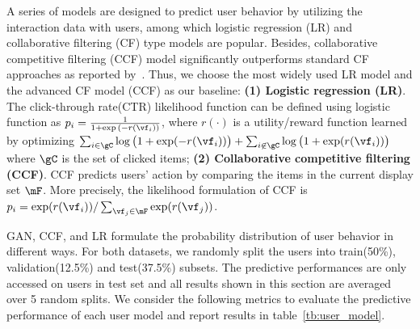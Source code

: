 \documentclass{article} %
\begin{document}
A series of models are designed to predict user behavior by utilizing the interaction data with users, among which logistic regression (LR) and collaborative filtering (CF) type models are popular. Besides, collaborative competitive filtering (CCF) model significantly outperforms standard CF approaches as reported by~\cite{YanLonSmoEtal11b}. Thus, we choose the most widely used LR model and the advanced CF model (CCF) as our baseline: {\bf (1) Logistic regression (LR)}. The click-through rate(CTR) likelihood function can be defined using logistic function as $p_i = \frac{1}{1+\exp{(-r(\vf_i))}}$, where $r(\cdot)$ is a utility/reward function learned by optimizing $\sum_{i\in \gC}\log \big(1+\exp(-r(\vf_i))\big) + \sum_{i \not\in \gC}\log\big(1+\exp(r(\vf_i))\big)$ where $\gC$ is the set of clicked items;
{\bf (2) Collaborative competitive filtering (CCF)}. CCF predicts users' action by comparing the items in the current display set $\mF$. More precisely, the likelihood formulation of CCF is $p_i = \exp(r(\vf_i))/\sum_{\vf_j \in \mF }\exp(r(\vf_j))$.

GAN, CCF, and LR formulate the probability distribution of user behavior in different ways. For both datasets, we randomly split the users into train(50\%), validation(12.5\%) and test(37.5\%) subsets. The predictive performances are only accessed on users in test set and all results shown in this section are averaged over 5 random splits. We consider the following metrics to evaluate the predictive performance of each user model and report results in table~\ref{tb:user_model}.
\end{document}
